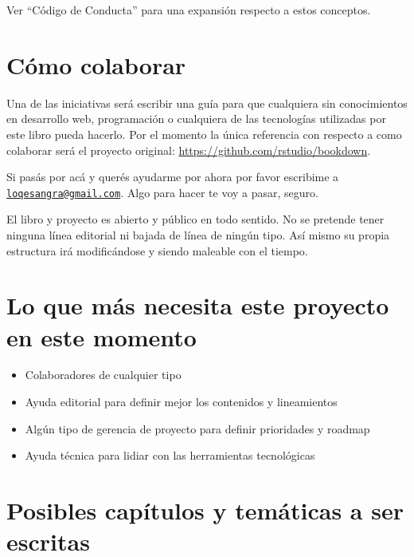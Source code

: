 \documentclass[
]{book}
\providecommand{\tightlist}{%
  \setlength{\itemsep}{0pt}\setlength{\parskip}{0pt}}
\begin{document}
Ver ``Código de Conducta'' para una expansión respecto a estos conceptos.

\hypertarget{cuxf3mo-colaborar}{%
\section{Cómo colaborar}\label{cuxf3mo-colaborar}}

Una de las iniciativas será escribir una guía para que cualquiera sin conocimientos en desarrollo web, programación o cualquiera de las tecnologías utilizadas por este libro pueda hacerlo. Por el momento la única referencia con respecto a como colaborar será el proyecto original: \url{https://github.com/rstudio/bookdown}.

Si pasás por acá y querés ayudarme por ahora por favor escribime a \href{mailto:loqesangra@gmail.com}{\nolinkurl{loqesangra@gmail.com}}. Algo para hacer te voy a pasar, seguro.

El libro y proyecto es abierto y público en todo sentido. No se pretende tener ninguna línea editorial ni bajada de línea de ningún tipo. Así mismo su propia estructura irá modificándose y siendo maleable con el tiempo.

\hypertarget{lo-que-muxe1s-necesita-este-proyecto-en-este-momento}{%
\section{Lo que más necesita este proyecto en este momento}\label{lo-que-muxe1s-necesita-este-proyecto-en-este-momento}}

\begin{itemize}
\tightlist
\item
  Colaboradores de cualquier tipo
\item
  Ayuda editorial para definir mejor los contenidos y lineamientos
\item
  Algún tipo de gerencia de proyecto para definir prioridades y roadmap
\item
  Ayuda técnica para lidiar con las herramientas tecnológicas
\end{itemize}

\hypertarget{posibles-capuxedtulos-y-temuxe1ticas-a-ser-escritas}{%
\section{Posibles capítulos y temáticas a ser escritas}\label{posibles-capuxedtulos-y-temuxe1ticas-a-ser-escritas}}
\end{document}
